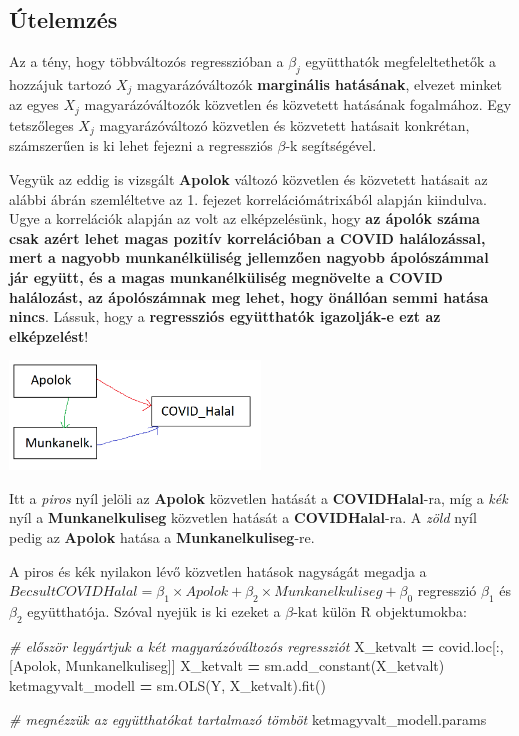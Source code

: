 \documentclass[
]{book}
\newenvironment{Shaded}{\begin{snugshade}}{\end{snugshade}}
\newcommand{\CommentTok}[1]{\textcolor[rgb]{0.56,0.35,0.01}{\textit{#1}}}
\newcommand{\NormalTok}[1]{#1}
\newcommand{\OperatorTok}[1]{\textcolor[rgb]{0.81,0.36,0.00}{\textbf{#1}}}
\newcommand{\StringTok}[1]{\textcolor[rgb]{0.31,0.60,0.02}{#1}}
\begin{document}
\subsection{Útelemzés}\label{uxfatelemzuxe9s}

Az a tény, hogy többváltozós regresszióban a \(\beta_j\) együtthatók megfeleltethetők a hozzájuk tartozó \(X_j\) magyarázóváltozók \textbf{marginális hatásának}, elvezet minket az egyes \(X_j\) magyarázóváltozók közvetlen és közvetett hatásának fogalmához. Egy tetszőleges \(X_j\) magyarázóváltozó közvetlen és közvetett hatásait konkrétan, számszerűen is ki lehet fejezni a regressziós \(\beta\)-k segítségével.

Vegyük az eddig is vizsgált \textbf{Apolok} változó közvetlen és közvetett hatásait az alábbi ábrán szemléltetve az 1. fejezet korrelációmátrixából alapján kiindulva. Ugye a korrelációk alapján az volt az elképzelésünk, hogy \textbf{az ápolók száma csak azért lehet magas pozitív korrelációban a COVID halálozással, mert a nagyobb munkanélküliség jellemzően nagyobb ápolószámmal jár együtt, és a magas munkanélküliség megnövelte a COVID halálozást, az ápolószámnak meg lehet, hogy önállóan semmi hatása nincs}. Lássuk, hogy a \textbf{regressziós együtthatók igazolják-e ezt az elképzelést}!

\includegraphics[width=0.5\textwidth,height=\textheight]{Utelemzes.png}

Itt a \emph{piros} nyíl jelöli az \textbf{Apolok} közvetlen hatását a \textbf{COVIDHalal}-ra, míg a \emph{kék} nyíl a \textbf{Munkanelkuliseg} közvetlen hatását a \textbf{COVIDHalal}-ra. A \emph{zöld} nyíl pedig az \textbf{Apolok} hatása a \textbf{Munkanelkuliseg}-re.

A piros és kék nyilakon lévő közvetlen hatások nagyságát megadja a \(BecsultCOVIDHalal=\beta_1 \times Apolok + \beta_2 \times Munkanelkuliseg + \beta_0\) regresszió \(\beta_1\) és \(\beta_2\) együtthatója. Szóval nyejük is ki ezeket a \(\beta\)-kat külön R objektumokba:

\begin{Shaded}
\begin{Highlighting}[]
\CommentTok{\# először legyártjuk a két magyarázóváltozós regressziót}
\NormalTok{X\_ketvalt }\OperatorTok{=}\NormalTok{ covid.loc[:,[}\StringTok{\textquotesingle{}Apolok\textquotesingle{}}\NormalTok{, }\StringTok{\textquotesingle{}Munkanelkuliseg\textquotesingle{}}\NormalTok{]]}
\NormalTok{X\_ketvalt }\OperatorTok{=}\NormalTok{ sm.add\_constant(X\_ketvalt)}
\NormalTok{ketmagyvalt\_modell }\OperatorTok{=}\NormalTok{ sm.OLS(Y, X\_ketvalt).fit()}

\CommentTok{\# megnézzük az együtthatókat tartalmazó tömböt}
\NormalTok{ketmagyvalt\_modell.params}
\end{Highlighting}
\end{Shaded}
\end{document}
